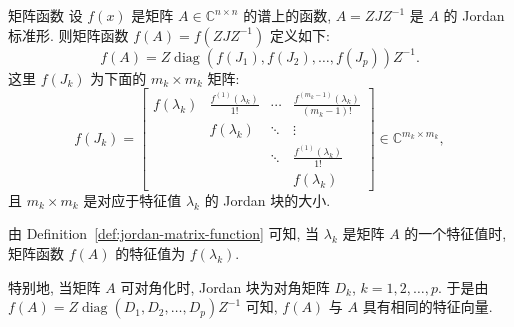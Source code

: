 \begin{Definition}{{矩阵函数}}\label{def:jordan-matrix-function}
{设 $f(x)$ 是矩阵 $A\in\mathbb{C}^{n\times n}$ 的谱上的函数, $A=ZJZ^{-1}$ 是 $A$ 的 Jordan 标准形. 则矩阵函数 $f(A)=f(ZJZ^{-1})$ 定义如下:}
\[f(A)=Z\operatorname{diag}(f(J_1),f(J_2),\ldots,f(J_p))Z^{-1}.\]
{这里 $f(J_k)$ 为下面的 $m_k\times m_k$ 矩阵:}
\[
f(J_k)=\begin{bmatrix}f(\lambda_k)&\frac{f^{(1)}(\lambda_k)}{1!}&\cdots&\frac{f^{(m_k-1)}(\lambda_k)}{(m_k-1)!}\\&f(\lambda_k)&\ddots&\vdots\\&&\ddots&\frac{f^{(1)}(\lambda_k)}{1!}\\&&&f(\lambda_k)\end{bmatrix}\in\mathbb{C}^{m_k\times m_k},
\]
{且 $m_k\times m_k$ 是对应于特征值 $\lambda_k$ 的 Jordan 块的大小.}
\end{Definition}

{由 Definition~\ref{def:jordan-matrix-function} 可知, 当 $\lambda_k$ 是矩阵 $A$ 的一个特征值时, 矩阵函数 $f(A)$ 的特征值为 $f(\lambda_k)$.}

{特别地, 当矩阵 $A$ 可对角化时, Jordan 块为对角矩阵 $D_k$, $k=1,2,\ldots,p$. 于是由 $f(A)=Z\operatorname{diag}(D_1,D_2,\ldots,D_p)Z^{-1}$ 可知, $f(A)$ 与 $A$ 具有相同的特征向量.}

